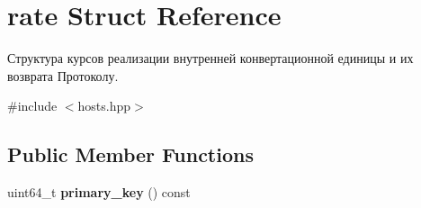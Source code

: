 \hypertarget{structrate}{}\section{rate Struct Reference}
\label{structrate}


Структура курсов реализации внутренней конвертационной единицы и их возврата Протоколу.  




{\ttfamily \#include $<$hosts.\+hpp$>$}

\subsection*{Public Member Functions}
\begin{DoxyCompactItemize}
\item 
\mbox{\label{structrate_a72d440ee345e18b0436f4aaf5053a453}} 
uint64\+\_\+t {\bfseries primary\+\_\+key} () const
\end{DoxyCompactItemize}
